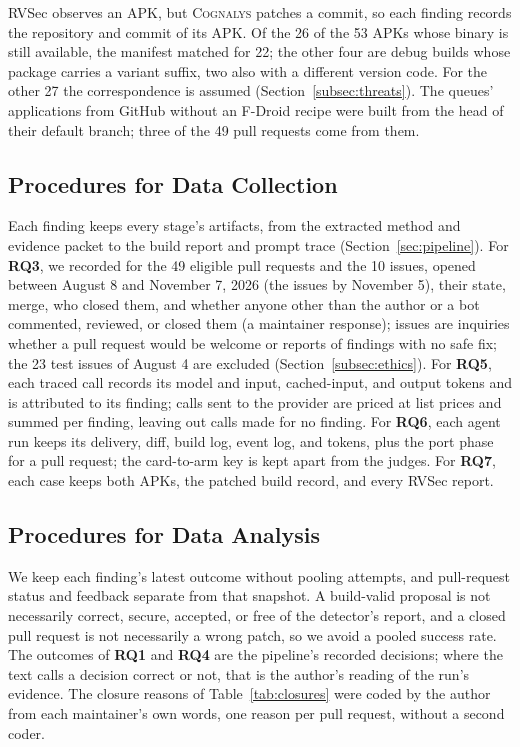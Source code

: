 \documentclass[conference]{IEEEtran}
\newcommand{\system}{\textsc{Cognalys}}
\newcommand{\researchq}[1]{\textbf{RQ#1}}
\begin{document}
RVSec observes an APK, but \system{} patches a commit, so each finding
records the repository and commit of its APK. Of the 26 of the 53 APKs whose
binary is still available, the manifest matched for 22; the other four are
debug builds whose package carries a variant suffix, two also with a
different version code.
For the other 27 the correspondence is assumed
(Section~\ref{subsec:threats}). The queues' applications from GitHub without an
F-Droid recipe were built from the head of their default branch; three of the
49 pull requests come from them.

\subsection{Procedures for Data Collection}
\label{subsec:collection}


Each finding keeps every stage's artifacts, from the extracted method and
evidence packet to the build report and prompt trace (Section~\ref{sec:pipeline}). For
\researchq{3}, we recorded for the 49 eligible pull requests and the 10 issues,
opened between August 8 and November 7, 2026 (the issues by November 5), their
state, merge, who closed them,
and whether anyone other than the author or a bot commented, reviewed, or
closed them (a maintainer response); issues are inquiries whether a pull
request would be welcome or reports of findings with no safe fix; the 23 test
issues of August 4 are excluded (Section~\ref{subsec:ethics}). For
\researchq{5}, each traced call records its model and input, cached-input, and
output tokens and is attributed to its finding; calls sent to the provider are
priced at list prices and summed per finding, leaving out calls made for no
finding. For \researchq{6}, each agent run keeps its delivery, diff, build
log, event log, and tokens, plus the port phase for a pull request; the
card-to-arm key is kept apart from the judges. For \researchq{7}, each case
keeps both APKs, the patched build record, and every RVSec report.

\subsection{Procedures for Data Analysis}
\label{subsec:analysis}

We keep each finding's latest outcome without pooling attempts, and pull-request status
and feedback separate from that snapshot. A build-valid proposal is not
necessarily correct, secure, accepted, or free of the detector's report, and a
closed pull request is not necessarily a wrong patch, so we avoid a pooled
success rate. The outcomes of \researchq{1} and \researchq{4} are the
pipeline's recorded decisions; where the text calls a decision correct or not,
that is the author's reading of the run's evidence. The closure reasons of
Table~\ref{tab:closures} were coded by the author from each maintainer's own
words, one reason per pull request, without a second coder.
\end{document}
